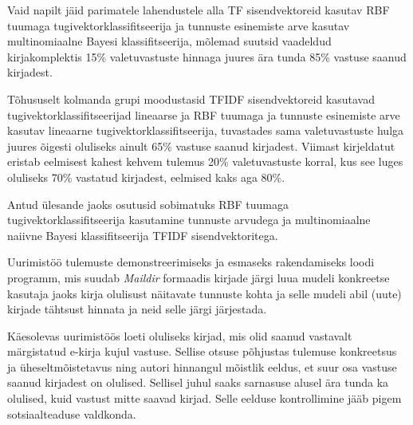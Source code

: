 \documentclass[]{trkuur}
\let\eng\emph
\begin{document}
Vaid napilt jäid parimatele lahendustele alla TF sisendvektoreid kasutav
RBF tuumaga tugivektorklassifitseerija ja tunnuste esinemiste arve kasutav
multinomiaalne Bayesi klassifitseerija, mõlemad suutsid vaadeldud kirjakomplektis
15\% valetuvastuste hinnaga juures ära tunda 85\% vastuse saanud kirjadest.

Tõhususelt kolmanda grupi moodustasid TFIDF sisendvektoreid kasutavad
tugivektorklassifitseerijad lineaarse ja RBF tuumaga ja tunnuste esinemiste arve kasutav lineaarne tugivektorklassifitseerija, tuvastades sama
valetuvastuste hulga juures õigesti oluliseks ainult 65\% vastuse saanud kirjadest.
Viimast kirjeldatut eristab eelmisest kahest kehvem tulemus 20\% valetuvastuste korral,
kus see luges oluliseks 70\% vastatud kirjadest, eelmised kaks aga 80\%.

Antud ülesande jaoks osutusid sobimatuks RBF tuumaga tugivektorklassifitseerija
kasutamine tunnuste arvudega ja multinomiaalne naiivne Bayesi klassifitseerija
TFIDF sisendvektoritega.

Uurimistöö tulemuste demonstreerimiseks ja esmaseks rakendamiseks loodi programm,
mis suudab \eng{Maildir} formaadis kirjade järgi luua mudeli konkreetse kasutaja
jaoks kirja olulisust näitavate tunnuste kohta ja selle mudeli abil (uute)
kirjade tähtsust hinnata ja neid selle järgi järjestada.

Käesolevas uurimistöös loeti oluliseks kirjad, mis olid saanud vastavalt
märgistatud e-kirja kujul vastuse. Sellise otsuse põhjustas tulemuse
konkreetsus ja üheseltmõistetavus ning autori hinnangul mõistlik eeldus,
et suur osa vastuse saanud kirjadest
on olulised. Sellisel juhul saaks sarnasuse alusel ära tunda ka
olulised, kuid vastust mitte saavad kirjad.
Selle eelduse kontrollimine jääb pigem sotsiaalteaduse valdkonda.


\printbibliography
\end{document}
